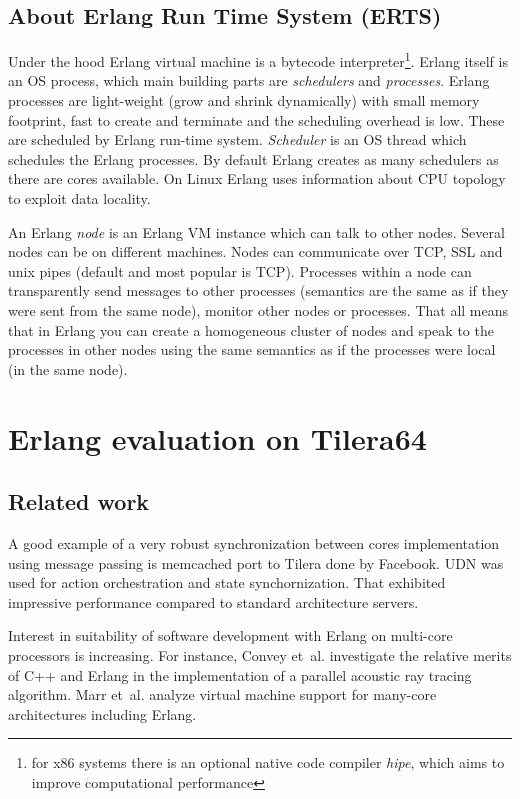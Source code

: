 \documentclass[english,11pt]{l4proj}
\begin{document}
\subsection{About Erlang Run Time System (ERTS)}

Under the hood Erlang virtual machine is a bytecode interpreter\footnote{for x86
systems there is an optional native code compiler \emph{hipe}\cite{hipe}, which
aims to improve computational performance}. Erlang itself is an OS process,
which main building parts are {\em schedulers} and {\em processes}. Erlang
processes are light-weight (grow and shrink dynamically) with small memory
footprint, fast to create and terminate and the scheduling overhead is low.
These are scheduled by Erlang run-time system. {\em Scheduler} is an OS thread
which schedules the Erlang processes. By default Erlang creates as many
schedulers as there are cores available. On Linux Erlang uses information about
CPU topology to exploit data locality.

An Erlang {\em node} is an Erlang VM instance which can talk to other nodes.
Several nodes can be on different machines. Nodes can communicate over TCP, SSL
and unix pipes (default and most popular is TCP). Processes within a node can
transparently send messages to other processes (semantics are the same as if
they were sent from the same node), monitor other nodes or processes. That all
means that in Erlang you can create a homogeneous cluster of nodes and speak to
the processes in other nodes using the same semantics as if the processes were
local (in the same node).

\section{Erlang evaluation on Tilera64}
\label{sec:erlang-eval}

\subsection{Related work}

A good example of a very robust synchronization between cores implementation
using message passing is memcached port to Tilera done by Facebook. UDN was used
for action orchestration and state synchornization\cite{facebook-tilera}. That
exhibited impressive performance compared to standard architecture servers.

Interest in suitability of software development with Erlang on multi-core
processors is increasing. For instance, Convey et~al.\cite{erlang-acoustic}
investigate the relative merits of C++ and Erlang in the implementation of a
parallel acoustic ray tracing algorithm. Marr et~al.\cite{vm-manycore} analyze
virtual machine support for many-core architectures including Erlang.
\end{document}
